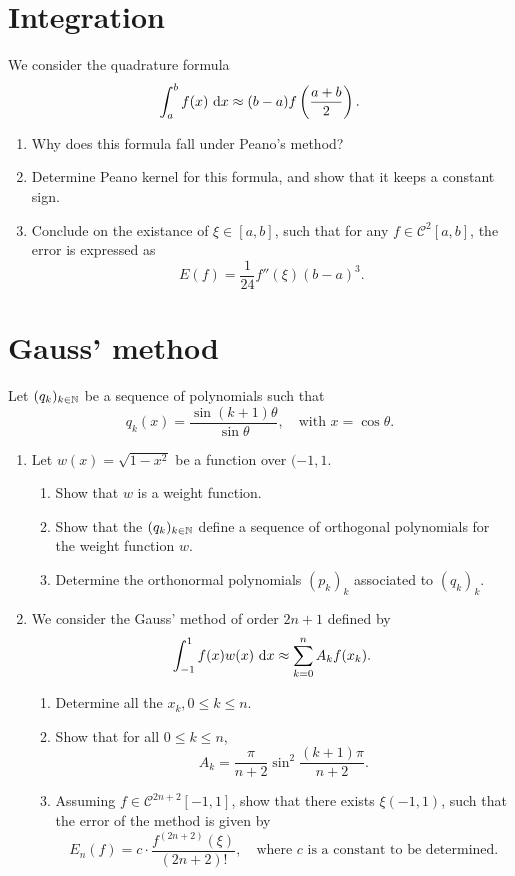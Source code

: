 \section{Integration}
We consider the quadrature formula
\[ \int_a^b f(x)~\mathrm{d} x\approx(b-a)f\left(\frac{a+b}{2}\right). \]
\begin{enumerate}
	\item Why does this formula fall under Peano's method?
	\item Determine Peano kernel for this formula, and show that it keeps a constant sign.
	\item Conclude on the existance of \(\xi\in[a,b]\), such that for any \(f\in\mathcal{C}^2[a,b]\), the error is expressed as
	\[ E(f)=\frac{1}{24}f''(\xi)(b-a)^3. \]
\end{enumerate}


\section{Gauss' method}
Let \((q_k)_{k\in\mathbb{N}}\) be a sequence of polynomials such that
\[ q_k(x)=\frac{\sin(k+1)\theta}{\sin\theta}, \quad\text{with } x=\cos\theta. \]
\begin{enumerate}
	\item Let \(w(x)=\sqrt{1-x^2}\) be a function over \((-1,1\).
	\begin{enumerate}
		\item Show that $w$ is a weight function.
		\item Show that the \((q_k)_{k\in\mathbb{N}}\) define a sequence of orthogonal polynomials for the weight function $w$.
		\item Determine the orthonormal polynomials \((p_k)_k\) associated to \((q_k)_k\).
	\end{enumerate}
	\item We consider the Gauss' method of order \(2n+1\) defined by
	\[ \int_{-1}^{1}f(x)w(x)~\mathrm{d} x\approx \sum_{k=0}^{n}A_kf(x_k). \]
	\begin{enumerate}
		\item Determine all the \(x_k,0\leq k\leq n\).
		\item Show that for all \(0\leq k\leq n\),
		\[ A_k=\frac{\pi}{n+2}\sin^2\frac{(k+1)\pi}{n+2}. \]
		\item Assuming \(f\in\mathcal{C}^{2n+2}[−1, 1]\), show that there exists \(\xi(−1,1)\), such that the error of the method is given by
		\[ E_n(f)=c\cdot\frac{f^{(2n+2)}(\xi)}{(2n+2)!},\quad \text{where }c\text{ is a constant to be determined.} \]
	\end{enumerate}
\end{enumerate}